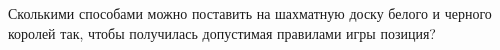 \question 
Сколькими способами можно поставить на шахматную доску белого и черного королей так, чтобы получилась допустимая правилами игры позиция?
